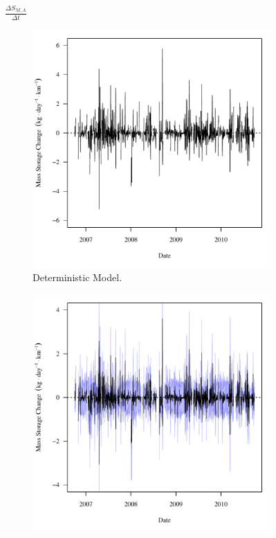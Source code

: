 \begin{linenumbers}
\subfiguretop
\begin{landscape}
	\begin{figure}
		$ \displaystyle \frac{\Delta S_{M,A}}{\Delta t} $
		\begin{subfigure}{0.7\textwidth}
			\centering
			\includegraphics[width=\tableCustomSize]{"Figures/Results_USR/Deterministic/f Segment A"}
			\caption{Deterministic Model.}
		\end{subfigure}%
		\begin{subfigure}{0.7\textwidth}
			\centering
			\includegraphics[width=\tableCustomSize]{"Figures/Results_USR/Stochastic/f Segment A"}

\end{subfigure}
\end{figure}
\end{landscape}
\end{linenumbers}
